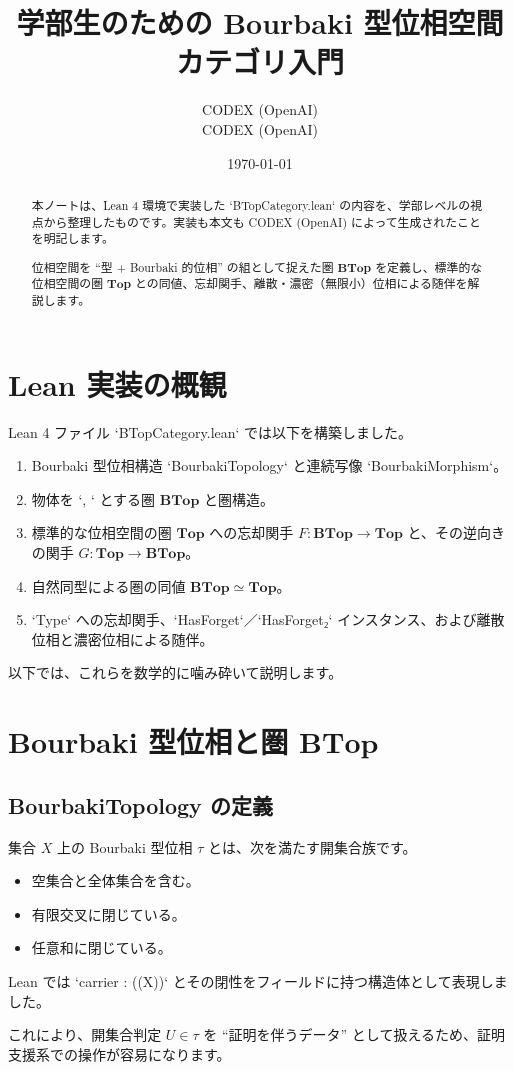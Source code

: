 \documentclass[12pt]{ltjsarticle}
\title{学部生のための Bourbaki 型位相空間カテゴリ入門}
\author{CODEX (OpenAI)\\CODEX (OpenAI)}
\date{\today}
\begin{document}
\maketitle

\begin{abstract}
本ノートは、Lean 4 環境で実装した `BTopCategory.lean` の内容を、学部レベルの視点から整理したものです。実装も本文も CODEX (OpenAI) によって生成されたことを明記します。\par
位相空間を ``型 + Bourbaki 的位相'' の組として捉えた圏 \(\mathbf{BTop}\) を定義し、標準的な位相空間の圏 \(\mathbf{Top}\) との同値、忘却関手、離散・濃密（無限小）位相による随伴を解説します。
\end{abstract}

\setcounter{tocdepth}{2}
\tableofcontents

\section{Lean 実装の概観}
Lean 4 ファイル `BTopCategory.lean` では以下を構築しました。
\begin{enumerate}[label=\arabic*)]
  \item Bourbaki 型位相構造 `BourbakiTopology` と連続写像 `BourbakiMorphism`。
  \item 物体を `\langle \alpha, \tau \rangle` とする圏 \(\mathbf{BTop}\) と圏構造。
  \item 標準的な位相空間の圏 \(\mathbf{Top}\) への忘却関手 \(F : \mathbf{BTop} \to \mathbf{Top}\) と、その逆向きの関手 \(G : \mathbf{Top} \to \mathbf{BTop}\)。
  \item 自然同型による圏の同値 \(\mathbf{BTop} \simeq \mathbf{Top}\)。
  \item `Type` への忘却関手、`HasForget`／`HasForget₂` インスタンス、および離散位相と濃密位相による随伴。
\end{enumerate}
以下では、これらを数学的に噛み砕いて説明します。

\section{Bourbaki 型位相と圏 \(\mathbf{BTop}\)}
\subsection{BourbakiTopology の定義}
集合 \(X\) 上の Bourbaki 型位相 \(\tau\) とは、次を満たす開集合族です。
\begin{itemize}
  \item 空集合と全体集合を含む。
  \item 有限交叉に閉じている。
  \item 任意和に閉じている。
\end{itemize}
Lean では `carrier : ((X))` とその閉性をフィールドに持つ構造体として表現しました。\par
これにより、開集合判定 \(U \in \tau\) を ``証明を伴うデータ'' として扱えるため、証明支援系での操作が容易になります。
\end{document}
